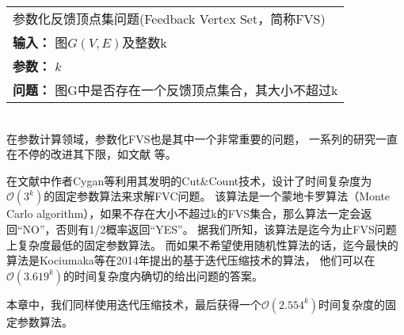 \begin{tabular}{| p{0.9\headwidth} |}
  \hline
  参数化反馈顶点集问题(Feedback Vertex Set，简称FVS) \\
  \textbf{输入：} 图$G(V, E)$及整数k \\
  \textbf{参数：} $k$\\
  \textbf{问题：} 图G中是否存在一个反馈顶点集合，其大小不超过k\\
  \hline
\end{tabular} \vspace{0.5cm} \\

在参数计算领域，参数化FVS也是其中一个非常重要的问题，
一系列的研究一直在不停的改进其下限，如文献\cite{bodlaender1994disjoint,downey1992fixed,downey2012parameterized,raman2006faster,kanj2004parameterized,dehne20072o,guo2006compression,chen2008improved,cao2010feedback,cygan2011solving,kociumaka2014faster} 等。

在文献\cite{cygan2011solving}中作者Cygan等利用其发明的Cut\&Count技术，设计了时间复杂度为$\mathcal{O}(3^k)$的固定参数算法来求解FVC问题。
该算法是一个蒙地卡罗算法（Monte Carlo algorithm），如果不存在大小不超过k的FVS集合，那么算法一定会返回“NO”，否则有1/2概率返回“YES”。
据我们所知，该算法是迄今为止FVS问题上复杂度最低的固定参数算法。
而如果不希望使用随机性算法的话，迄今最快的算法是Kociumaka等在2014年提出的基于迭代压缩技术的算法，
他们可以在$\mathcal{O}(3.619^k)$的时间复杂度内确切的给出问题的答案。

本章中，我们同样使用迭代压缩技术，最后获得一个\textcolor[rgb]{1.00,0.00,0.00}{$\mathcal{O}(2.554^k)$}时间复杂度的固定参数算法。


